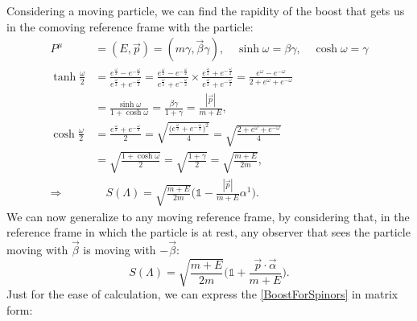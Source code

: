 Considering a moving particle, we can find the rapidity of the boost that gets us in the comoving reference frame with the particle:
\begin{align*}
    P^\mu&=(E,\vec p)=(m\gamma,\vec \beta \gamma),\quad \sinh\omega=\beta\gamma,\quad\cosh\omega=\gamma\\ \tanh\frac{\omega}{2}&=\frac{e^{\frac{\omega}{2}}-e^{-\frac{\omega}{2}}}{e^{\frac{\omega}{2}}+e^{-\frac{\omega}{2}}}=\frac{e^{\frac{\omega}{2}}-e^{-\frac{\omega}{2}}}{e^{\frac{\omega}{2}}+e^{-\frac{\omega}{2}}}\times \frac{e^{\frac{\omega}{2}}+e^{-\frac{\omega}{2}}}{e^{\frac{\omega}{2}}+e^{-\frac{\omega}{2}}}=\frac{e^{\omega}-e^{-\omega}}{2+e^{\omega}+e^{-\omega}}\\&=\frac{\sinh\omega}{1+\cosh\omega}=\frac{\beta \gamma}{1+\gamma}=\frac{|\vec p|}{m+E},\\
    \cosh\frac{\omega}{2}&=\frac{e^\frac{\omega}{2}+e^{-\frac{\omega}{2}}}{2}=\sqrt{\frac{\big(e^\frac{\omega}{2}+e^{-\frac{\omega}{2}}\big)^2}{4}}=\sqrt{\frac{2+e^\omega+e^{-\omega}}{4}}\\&=\sqrt{\frac{1+\cosh\omega}{2}}=\sqrt{\frac{1+\gamma}{2}}=\sqrt{\frac{m+E}{2m}},
    \\\Rightarrow&\quad S(\Lambda)=\sqrt{\frac{m+E}{2m}}\bigg(\mathds{1}-\frac{|\vec p|}{m+E}\alpha^1\bigg).
\end{align*}
We can now generalize to any moving reference frame, by considering that, in the reference frame in which the particle is at rest, any observer that sees the particle moving with $\vec\beta$ is moving with $-\vec\beta$:
\begin{equation}\label{BoostForSpinors}
    S(\Lambda)=\sqrt{\frac{m+E}{2m}}\bigg(\mathds{1}+\frac{\vec p\cdot\vec\alpha}{m+E}\bigg).
\end{equation}
Just for the ease of calculation, we can express the \eqref{BoostForSpinors} in matrix form:
